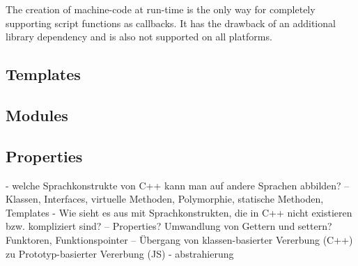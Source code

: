 The creation of machine-code at run-time is the only way for completely supporting script functions as callbacks. It has the drawback of an additional library dependency and is also not supported on all platforms.

\subsection{Templates}

\subsection{Modules}

\subsection{Properties}








 - welche Sprachkonstrukte von C++ kann man auf andere Sprachen abbilden? 
 -- Klassen, Interfaces, virtuelle Methoden, Polymorphie, statische Methoden, Templates
 - Wie sieht es aus mit Sprachkonstrukten, die in C++ nicht existieren bzw. kompliziert sind?
 -- Properties? Umwandlung von Gettern und settern? Funktoren, Funktionspointer
 -- Übergang von klassen-basierter Vererbung (C++) zu Prototyp-basierter Vererbung (JS)
 - abstrahierung